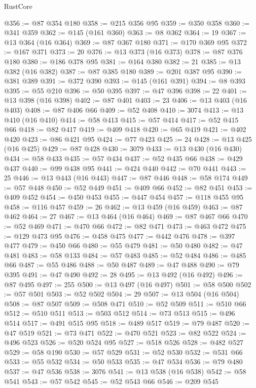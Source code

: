 \begin{lexlean}{RustCore}
\begin{coremodule}
@356 := @87 @354 @180
@358 := @215 @356 @95
@359 := @350 @358
@360 := @341 @359
@362 := @145 (@161 @360)
@363 := @8 @362
@364 := 19
@367 := @13 @364 (@16 @364)
@369 := @87 @367 @180
@371 := @170 @369 @95
@372 := @167 @371
@373 := 20
@376 := @13 @373 (@16 @373)
@378 := @87 @376 @180
@380 := @186 @378 @95
@381 := @164 @380
@382 := 21
@385 := @13 @382 (@16 @382)
@387 := @87 @385 @180
@389 := @201 @387 @95
@390 := @381 @389
@391 := @372 @390
@393 := @145 (@161 @391)
@394 := @8 @393
@395 := @55 @210
@396 := @50 @395
@397 := @47 @396
@398 := 22
@401 := @13 @398 (@16 @398)
@402 := @87 @401
@403 := 23
@406 := @13 @403 (@16 @403)
@408 := @87 @406 @66
@409 := @52 @408
@410 := 3074
@413 := @13 @410 (@16 @410)
@414 := @58 @413
@415 := @57 @414
@417 := @52 @415 @66
@418 := @82 @417
@419 := @409 @418
@420 := @65 @419
@421 := @402 @420
@423 := @86 @421 @95
@424 := @77 @423
@425 := 24
@428 := @13 @425 (@16 @425)
@429 := @87 @428
@430 := 3079
@433 := @13 @430 (@16 @430)
@434 := @58 @433
@435 := @57 @434
@437 := @52 @435 @66
@438 := @429 @437
@440 := @99 @438 @95
@441 := @424 @440
@442 := @70 @441
@443 := 25
@446 := @13 @443 (@16 @443)
@447 := @87 @446
@448 := @58 @174
@449 := @57 @448
@450 := @52 @449
@451 := @409 @66
@452 := @82 @451
@453 := @409 @452
@454 := @450 @453
@455 := @447 @454
@457 := @118 @455 @95
@458 := @116 @457
@459 := 26
@462 := @13 @459 (@16 @459)
@463 := @87 @462
@464 := 27
@467 := @13 @464 (@16 @464)
@469 := @87 @467 @66
@470 := @52 @469
@471 := @470 @66
@472 := @82 @471
@473 := @463 @472
@475 := @129 @473 @95
@476 := @458 @475
@477 := @442 @476
@478 := @397 @477
@479 := @450 @66
@480 := @55 @479
@481 := @50 @480
@482 := @47 @481
@483 := @58 @133
@484 := @57 @483
@485 := @52 @484
@486 := @485 @66
@487 := @55 @486
@488 := @50 @487
@489 := @47 @488
@490 := @79 @395
@491 := @47 @490
@492 := 28
@495 := @13 @492 (@16 @492)
@496 := @87 @495
@497 := 255
@500 := @13 @497 (@16 @497)
@501 := @58 @500
@502 := @57 @501
@503 := @52 @502
@504 := 29
@507 := @13 @504 (@16 @504)
@508 := @87 @507
@509 := @508 @471
@510 := @52 @509
@511 := @510 @66
@512 := @510 @511
@513 := @503 @512
@514 := @73 @513
@515 := @496 @514
@517 := @491 @515 @95
@518 := @489 @517
@519 := @79 @487
@520 := @47 @519
@521 := @73 @471
@522 := @470 @521
@523 := @82 @522
@524 := @496 @523
@526 := @520 @524 @95
@527 := @518 @526
@528 := @482 @527
@529 := @58 @190
@530 := @57 @529
@531 := @52 @530
@532 := @531 @66
@533 := @55 @532
@534 := @50 @533
@535 := @47 @534
@536 := @79 @480
@537 := @47 @536
@538 := 3076
@541 := @13 @538 (@16 @538)
@542 := @58 @541
@543 := @57 @542
@545 := @52 @543 @66
@546 := @209 @545

\end{coremodule}
\end{lexlean}
